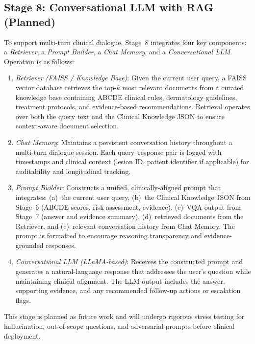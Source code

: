 \documentclass[conference]{IEEEtran}
\begin{document}
\subsection{Stage 8: Conversational LLM with RAG (Planned)}

To support multi-turn clinical dialogue, Stage~8 integrates four key
components: a \emph{Retriever}, a \emph{Prompt Builder}, a \emph{Chat Memory},
and a \emph{Conversational LLM}. Operation is as follows:

\begin{enumerate}[leftmargin=*]
    \item \emph{Retriever (FAISS / Knowledge Base)}: Given the current user
          query, a FAISS vector database retrieves the top-$k$ most relevant
          documents from a curated knowledge base containing ABCDE clinical
          rules, dermatology guidelines, treatment protocols, and evidence-based
          recommendations. Retrieval operates over both the query text and the
          Clinical Knowledge JSON to ensure context-aware document selection.
    \item \emph{Chat Memory}: Maintains a persistent conversation history
          throughout a multi-turn dialogue session. Each query--response pair is
          logged with timestamps and clinical context (lesion ID, patient
          identifier if applicable) for auditability and longitudinal tracking.
    \item \emph{Prompt Builder}: Constructs a unified, clinically-aligned
          prompt that integrates: (a)~the current user query, (b)~the Clinical
          Knowledge JSON from Stage~6 (ABCDE scores, risk assessment, evidence),
          (c)~VQA output from Stage~7 (answer and evidence summary), (d)~retrieved
          documents from the Retriever, and (e)~relevant conversation history from
          Chat Memory. The prompt is formatted to encourage reasoning transparency
          and evidence-grounded responses.
    \item \emph{Conversational LLM (LLaMA-based)}: Receives the constructed
          prompt and generates a natural-language response that addresses the
          user's question while maintaining clinical alignment. The LLM output
          includes the answer, supporting evidence, and any recommended follow-up
          actions or escalation flags.
\end{enumerate}

This stage is planned as future work and will undergo rigorous stress testing
for hallucination, out-of-scope questions, and adversarial prompts before
clinical deployment.
\end{document}
